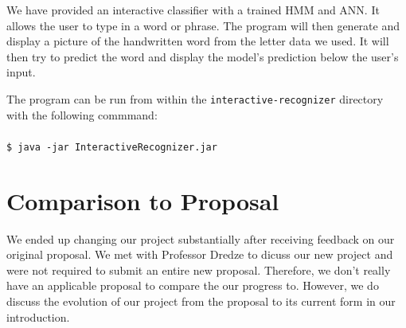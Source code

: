 \documentclass[11pt,letterpaper]{article}
\begin{document}
We have provided an interactive classifier with a trained HMM and ANN\@. It allows the user
to type in a word or phrase. The program will then generate and display a picture of the handwritten
word from the letter data we used. It will then try to predict the word and display the model's
prediction below the user's input.

The program can be run from within the \texttt{interactive-recognizer}
directory with the following commmand:\\\\
\texttt{\$ java -jar InteractiveRecognizer.jar}

\section{Comparison to Proposal}
We ended up changing our project substantially after receiving feedback on our original proposal. We
met with Professor Dredze to dicuss our new project and were not required to submit an entire new
proposal. Therefore, we don't really have an applicable proposal to compare the our progress to.
However, we do discuss the evolution of our project from the proposal to its current form
in our introduction.
\end{document}
